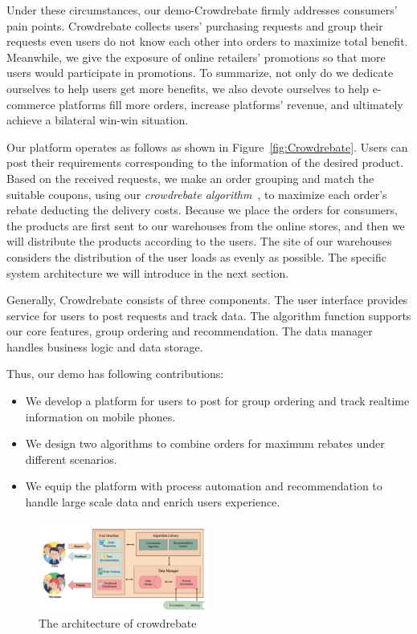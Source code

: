 Under these circumstances, our demo-Crowdrebate firmly addresses consumers' pain points. Crowdrebate collects users' purchasing requests and group their requests even users do not know each other into orders to maximize total benefit. Meanwhile, we give the exposure of online retailers' promotions so that more users would participate in promotions. To summarize, not only do we dedicate ourselves to help users get more benefits, we also devote ourselves to help e-commerce platforms fill more orders, increase platforms’ revenue, and ultimately achieve a bilateral win-win situation.

Our platform operates as follows as shown in Figure~\ref{fig:Crowdrebate}. Users can post their requirements corresponding to the information of the desired product. Based on the received requests, we make an order grouping and match the suitable coupons, using our \emph{crowdrebate algorithm}~\cite{Report}, to maximize each order's rebate deducting the delivery costs. Because we place the orders for consumers, the products are first sent to our warehouses from the online stores, and then we will distribute the products according to the users. The site of our warehouses considers the distribution of the user loads as evenly as possible. The specific system architecture we will introduce in the next section.

Generally, Crowdrebate consists of three components. The user interface provides service for users to post requests and track data. The algorithm function supports our core features, group ordering and recommendation. The data manager handles business logic and data storage.

Thus, our demo has following contributions:
\begin{itemize}
	\item We develop a platform for users to post for group ordering and track realtime information on mobile phones.
	\item We design two algorithms to combine orders for maximum rebates under different scenarios.
	\item We equip the platform with process automation and recommendation to handle large scale data and enrich users experience.
\end{itemize}
\begin{figure}[t] \vspace{-2ex}
	\centering %
	\includegraphics[width=0.5\textwidth]{../figure/ar.png} %
	\caption{The architecture of crowdrebate} %
	\label{fig:ar} %
	\vspace{-3ex}
\end{figure}

